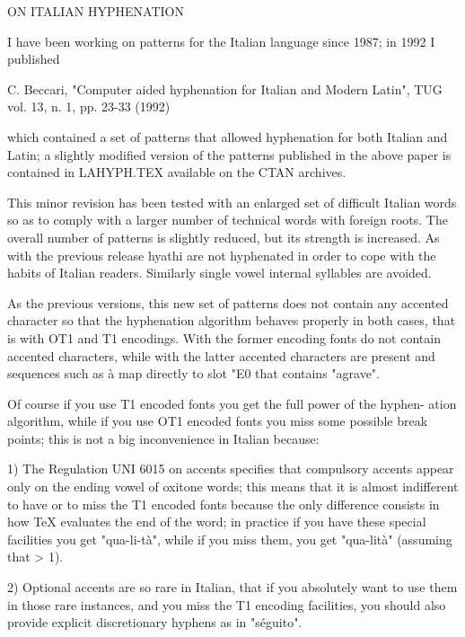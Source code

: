                            ON ITALIAN HYPHENATION

I have been working on patterns for the Italian language since 1987; in 1992
I published

C. Beccari, "Computer aided hyphenation for Italian and Modern
      Latin", TUG vol. 13, n. 1, pp. 23-33 (1992)

which contained a set of patterns that allowed hyphenation for both  Italian
and  Latin;  a  slightly  modified  version of the patterns published in the
above paper is contained in LAHYPH.TEX available on the CTAN archives.


This minor revision has been tested  with an enlarged set of difficult Italian
words so as to comply  with  a larger  number  of technical words with foreign
roots. The overall number of patterns is slightly reduced, but its strength is
increased. As with the previous  release hyathi are not hyphenated in order to
cope  with  the  habits  of Italian  readers.  Similarly single vowel internal
syllables are avoided.

As the previous versions, this new set  of  patterns does  not  contain  any
accented  character  so  that  the hyphenation algorithm behaves properly in
both cases, that is with OT1 and T1 encodings.   With  the  former  encoding
fonts  do  not contain  accented characters,  while with the latter accented
characters are present and sequences such as ^^e0 map directly to slot "E0 that
contains "agrave".

Of course if you use T1 encoded  fonts you get the full power of the hyphen-
ation algorithm, while if you use OT1 encoded  fonts you  miss some possible  
break  points;  this  is  not a big inconvenience in Italian because:

1) The Regulation UNI 6015 on  accents  specifies  that  compulsory  accents
   appear  only  on the ending vowel of oxitone words; this means that it is
   almost indifferent to have or  to  miss  the T1 encoded fonts because the 
   only  difference  consists in how TeX  evaluates  the end of the word; in 
   practice if you have these special  facilities you get "qua-li-t^^e0", while 
   if  you miss them, you get "qua-lit^^e0" (assuming that \righthyphenmin > 1).

2)  Optional  accents are so rare in Italian, that if you absolutely want to
   use  them  in  those  rare  instances,  and  you  miss  the  T1  encoding
   facilities, you should also provide  explicit discretionary hyphens as in
   "s^^e9\-gui\-to".

